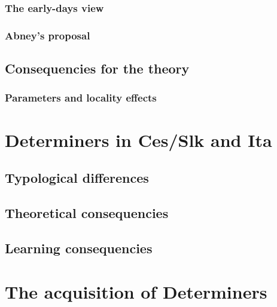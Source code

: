 \documentclass[
  a4paper,
  twoside,
  12pt,
  chapterprefix=false,
  bibliography=totocnumbered,
  listof=flat]{scrbook}
\begin{document}
\hypertarget{the-early-days-view}{%
\subsubsection{The early-days view}\label{the-early-days-view}}

\hypertarget{abneys-proposal}{%
\subsubsection{Abney's proposal}\label{abneys-proposal}}

\hypertarget{consequencies-for-the-theory}{%
\subsection{Consequencies for the theory}\label{consequencies-for-the-theory}}

\hypertarget{parameters-and-locality-effects}{%
\subsubsection{Parameters and locality effects}\label{parameters-and-locality-effects}}

\hypertarget{determiners-in-cesslk-and-ita}{%
\section{Determiners in Ces/Slk and Ita}\label{determiners-in-cesslk-and-ita}}

\hypertarget{typological-differences}{%
\subsection{Typological differences}\label{typological-differences}}

\hypertarget{theoretical-consequencies}{%
\subsection{Theoretical consequencies}\label{theoretical-consequencies}}

\hypertarget{learning-consequencies}{%
\subsection{Learning consequencies}\label{learning-consequencies}}

\hypertarget{the-acquisition-of-determiners}{%
\section{The acquisition of Determiners}\label{the-acquisition-of-determiners}}
\end{document}
